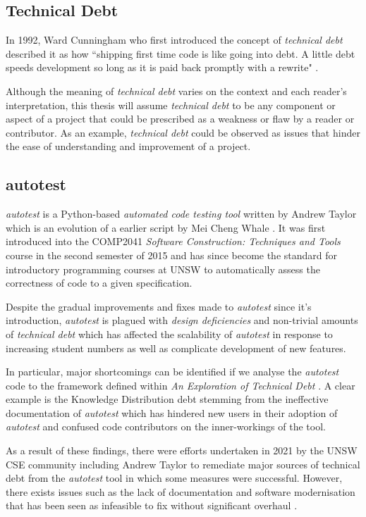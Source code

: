 \documentclass[hidelinks]{report}
\begin{document}
\subsection{Technical Debt}
In 1992, Ward Cunningham who first introduced the concept of \textit{technical debt} described it as how ``shipping first time code is like going into debt. A little debt speeds development so long as it is paid back promptly with a rewrite" \cite{TechnicalDebtConcept}.

Although the meaning of \textit{technical debt} varies on the context and each reader's interpretation, this thesis will assume \textit{technical debt} to be any component or aspect of a project that could be prescribed as a weakness or flaw by a reader or contributor. As an example, \textit{technical debt} could be observed as issues that hinder the ease of understanding and improvement of a project. 

\subsection{autotest}
\textit{autotest} is a Python-based \textit{automated code testing tool} written by Andrew Taylor which is an evolution of a earlier script by Mei Cheng Whale \cite{Autotest}. It was first introduced into the COMP2041 \textit{Software Construction: Techniques and Tools} course in the second semester of 2015 and has since become the standard for introductory programming courses at UNSW to automatically assess the correctness of code to a given specification.

Despite the gradual improvements and fixes made to \textit{autotest} since it's introduction, \textit{autotest} is plagued with \textit{design deficiencies} and non-trivial amounts of \textit{technical debt} which has affected the scalability of \textit{autotest} in response to increasing student numbers as well as complicate development of new features.

In particular, major shortcomings can be identified if we analyse the \textit{autotest} code to the framework defined within \textit{An Exploration of Technical Debt} \cite{TechnicalDebt}. A clear example is the Knowledge Distribution debt stemming from the ineffective documentation of \textit{autotest} which has hindered new users in their adoption of \textit{autotest} and confused code contributors on the inner-workings of the tool.

As a result of these findings, there were efforts undertaken in 2021 by the UNSW CSE community including Andrew Taylor to remediate major sources of technical debt from the \textit{autotest} tool in which some measures were successful. However, there exists issues such as the lack of documentation and software modernisation that has been seen as infeasible to fix without significant overhaul \cite{AutotestIssues}.
\end{document}
